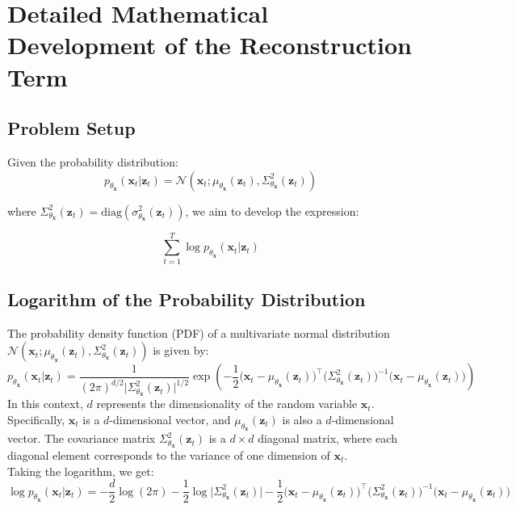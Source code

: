 \section{Detailed Mathematical Development of the Reconstruction Term}
\label{sec:elbo_recon}
%
\subsection*{Problem Setup}

Given the probability distribution:
\begin{equation*}
    p_{\theta_{\bm{x}}}(\bm{x}_t | \bm{z}_{t}) = 
    \mathcal{N}(\bm{x}_t; \mu_{\theta_{\bm{x}}}(\bm{z}_{t}), 
    \Sigma^2_{\theta_{\bm{x}}}(\bm{z}_{t}))
\end{equation*}

where $\Sigma^2_{\theta_{\bm{x}}}(\bm{z}_{t}) = 
\mathrm{diag}(\sigma^2_{\theta_{\bm{x}}}(\bm{z}_{t}))$,
we aim to develop the expression:

\begin{equation*}
    \sum_{t=1}^T \log p_{\theta_{\bm{x}}}(\bm{x}_t | \bm{z}_{t})
\end{equation*}

\subsection*{Logarithm of the Probability Distribution}
The probability density function (PDF) of a multivariate normal 
distribution $\mathcal{N}(\bm{x}_t; \mu_{\theta_{\bm{x}}}(\bm{z}_{t}), 
\Sigma^2_{\theta_{\bm{x}}}(\bm{z}_{t}))$ is given by:
%
\begin{equation*}
    p_{\theta_{\bm{x}}}(\bm{x}_t | \bm{z}_{t}) = 
    \frac{1}{(2\pi)^{d/2} 
    \big|\Sigma^2_{\theta_{\bm{x}}}(\bm{z}_{t}) \big|^{1/2}} 
    \exp\left(-\frac{1}{2} \big(\bm{x}_t - 
    \mu_{\theta_{\bm{x}}}(\bm{z}_{t})\big)^\top 
    \big(\Sigma^2_{\theta_{\bm{x}}}(\bm{z}_{t})\big)^{-1} \big(\bm{x}_t - 
    \mu_{\theta_{\bm{x}}}(\bm{z}_{t})\big)\right)    
\end{equation*}
%
\newline
In this context, \(d\) represents the dimensionality of the random variable 
\(\bm{x}_t\). Specifically, \(\bm{x}_t\) is a \(d\)-dimensional vector, 
and \(\mu_{\theta_{\bm{x}}}(\bm{z}_{t})\) is also a \(d\)-dimensional vector. 
The covariance matrix \(\Sigma^2_{\theta_{\bm{x}}}(\bm{z}_{t})\) is a 
\(d \times d\) diagonal matrix, where 
each diagonal element corresponds to the variance of one dimension of \(\bm{x}_t\).\\
%
\newline
%
Taking the logarithm, we get:
\begin{equation*}
    \log p_{\theta_{\bm{x}}}(\bm{x}_t | \bm{z}_{t}) = 
    -\frac{d}{2} \log(2\pi) - \frac{1}{2} \log 
    \big|\Sigma^2_{\theta_{\bm{x}}}(\bm{z}_{t})\big| - 
    \frac{1}{2} \big(\bm{x}_t - \mu_{\theta_{\bm{x}}}(\bm{z}_{t})\big)^\top 
    \big(\Sigma^2_{\theta_{\bm{x}}}(\bm{z}_{t})\big)^{-1} 
    \big(\bm{x}_t - \mu_{\theta_{\bm{x}}}(\bm{z}_{t})\big)
\end{equation*}


